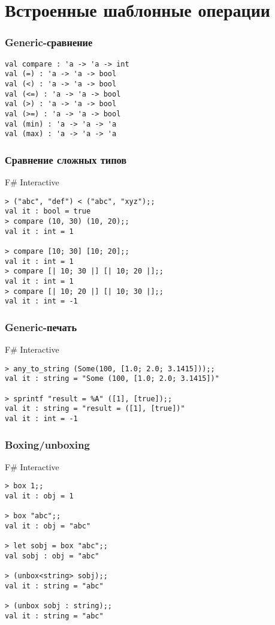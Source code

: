 \documentclass[xetex,mathserif,serif]{beamer}
\begin{document}
    \section{Встроенные шаблонные операции}

    \begin{frame}[fragile]
        \frametitle{Generic-сравнение}
        \begin{verbatim}
val compare : 'a -> 'a -> int
val (=) : 'a -> 'a -> bool
val (<) : 'a -> 'a -> bool
val (<=) : 'a -> 'a -> bool
val (>) : 'a -> 'a -> bool
val (>=) : 'a -> 'a -> bool
val (min) : 'a -> 'a -> 'a
val (max) : 'a -> 'a -> 'a
        \end{verbatim}
    \end{frame}

    \begin{frame}[fragile]
        \frametitle{Сравнение сложных типов}
        \begin{alertblock}{F\# Interactive}
            \begin{verbatim}
> ("abc", "def") < ("abc", "xyz");;
val it : bool = true
> compare (10, 30) (10, 20);;
val it : int = 1

> compare [10; 30] [10; 20];;
val it : int = 1
> compare [| 10; 30 |] [| 10; 20 |];;
val it : int = 1
> compare [| 10; 20 |] [| 10; 30 |];;
val it : int = -1
            \end{verbatim}
        \end{alertblock}
    \end{frame}

    \begin{frame}[fragile]
        \frametitle{Generic-печать}
        \begin{alertblock}{F\# Interactive}
            \begin{verbatim}
> any_to_string (Some(100, [1.0; 2.0; 3.1415]));;
val it : string = "Some (100, [1.0; 2.0; 3.1415])"

> sprintf "result = %A" ([1], [true]);;
val it : string = "result = ([1], [true])"
val it : int = -1
            \end{verbatim}
        \end{alertblock}
    \end{frame}

    \begin{frame}[fragile]
        \frametitle{Boxing/unboxing}
        \begin{alertblock}{F\# Interactive}
            \begin{verbatim}
> box 1;;
val it : obj = 1

> box "abc";;
val it : obj = "abc"

> let sobj = box "abc";;
val sobj : obj = "abc"

> (unbox<string> sobj);;
val it : string = "abc"

> (unbox sobj : string);;
val it : string = "abc"
            \end{verbatim}
        \end{alertblock}
    \end{frame}
\end{document}

